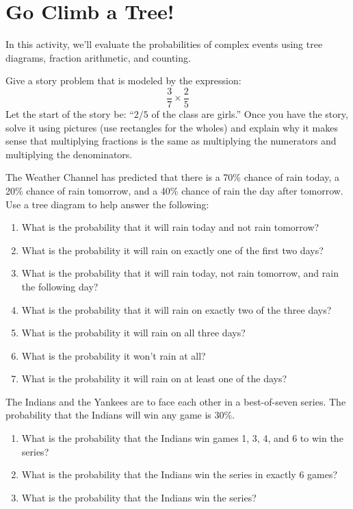 \newpage
\section{Go Climb a Tree!} 


In this activity, we'll evaluate the probabilities of complex events
using tree diagrams, fraction arithmetic, and counting.

\begin{prob}
Give a story problem that is modeled by the expression:
\[
\frac{3}{7} \times \frac{2}{5}
\]  
Let the start of the story be: ``$2/5$ of the class are girls.''  Once
you have the story, solve it using pictures (use rectangles for the
wholes) and explain why it makes sense that multiplying fractions is
the same as multiplying the numerators and multiplying the
denominators.
\end{prob}

\begin{prob}
The Weather Channel has predicted that there is a 70\% chance of rain today, a 20\% chance of rain tomorrow, and a 40\% chance of rain the day after tomorrow.  Use a tree diagram to help answer the following:
\begin{enumerate}
\item What is the probability that it will rain today and not rain tomorrow? 
\item What is the probability it will rain on exactly one of the first two days?
\item What is the probability that it will rain today, not rain tomorrow, and rain the following day?
\item What is the probability that it will rain on exactly two of the three days?
\item What is the probability it will rain on all three days?
\item What is the probability it won't rain at all?
\item What is the probability it will rain on at least one of the days?
\end{enumerate}
\end{prob}

\begin{prob}
The Indians and the Yankees are to face each other in a best-of-seven series.  The probability that the Indians will win any game is 30\%.
\begin{enumerate}
\item What is the probability that the Indians win games 1, 3, 4, and 6 to win the series?
\item What is the probability that the Indians win the series in exactly 6 games?
\item What is the probability that the Indians win the series?
\end{enumerate}
\end{prob}

